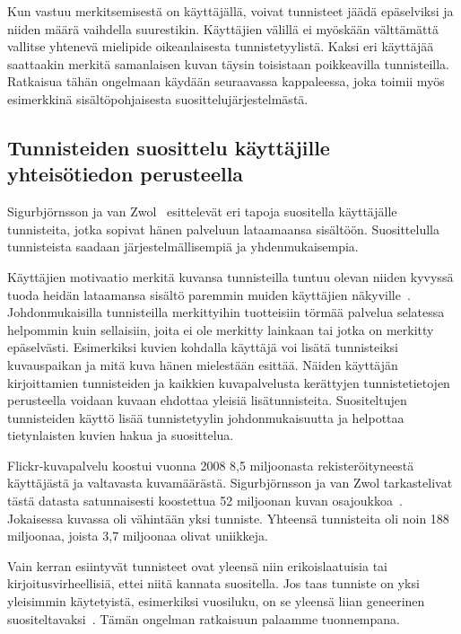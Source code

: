 \documentclass[12pt,finnish]{tktltiki2}
\theoremstyle{definition}
\theoremstyle{remark}
\begin{document}
Kun vastuu merkitsemisestä on käyttäjällä, voivat tunnisteet jäädä epäselviksi ja niiden määrä vaihdella suurestikin. Käyttäjien välillä ei myöskään välttämättä vallitse yhtenevä mielipide oikeanlaisesta tunnistetyylistä. Kaksi eri käyttäjää saattaakin merkitä samanlaisen kuvan täysin toisistaan poikkeavilla tunnisteilla. Ratkaisua tähän ongelmaan käydään seuraavassa kappaleessa, joka toimii myös esimerkkinä sisältöpohjaisesta suosittelujärjestelmästä.


\subsection{Tunnisteiden suosittelu käyttäjille yhteisötiedon perusteella}

Sigurbjörnsson ja van Zwol~\cite{Sigurbjornsson:2008:FTR:1367497.1367542} esittelevät eri tapoja suositella käyttäjälle tunnisteita, jotka sopivat hänen palveluun lataamaansa sisältöön. Suosittelulla tunnisteista saadaan järjestelmällisempiä ja yhdenmukaisempia.

Käyttäjien motivaatio merkitä kuvansa tunnisteilla tuntuu olevan niiden kyvyssä tuoda heidän lataamansa sisältö paremmin muiden käyttäjien näkyville~\cite{Ames:2007:WWT:1240624.1240772}. Johdonmukaisilla tunnisteilla merkittyihin tuotteisiin törmää palvelua selatessa helpommin kuin sellaisiin, joita ei ole merkitty lainkaan tai jotka on merkitty epäselvästi. Esimerkiksi kuvien kohdalla käyttäjä voi lisätä tunnisteiksi kuvauspaikan ja mitä kuva hänen mielestään esittää. Näiden käyttäjän kirjoittamien tunnisteiden ja kaikkien kuvapalvelusta kerättyjen tunnistetietojen perusteella voidaan kuvaan ehdottaa yleisiä lisätunnisteita. Suositeltujen tunnisteiden käyttö lisää tunnistetyylin johdonmukaisuutta ja helpottaa tietynlaisten kuvien hakua ja suosittelua.

Flickr-kuvapalvelu koostui vuonna 2008 8,5 miljoonasta rekisteröityneestä käyttäjästä ja valtavasta kuvamäärästä. Sigurbjörnsson ja van Zwol tarkastelivat tästä datasta satunnaisesti koostettua 52 miljoonan kuvan osajoukkoa~\cite{Sigurbjornsson:2008:FTR:1367497.1367542}. Jokaisessa kuvassa oli vähintään yksi tunniste. Yhteensä tunnisteita oli noin 188 miljoonaa, joista 3,7 miljoonaa olivat uniikkeja.

	Vain kerran esiintyvät tunnisteet ovat yleensä niin erikoislaatuisia tai kirjoitusvirheellisiä, ettei niitä kannata suositella. Jos taas tunniste on yksi yleisimmin käytetyistä, esimerkiksi vuosiluku, on se yleensä liian geneerinen suositeltavaksi~\cite{Sigurbjornsson:2008:FTR:1367497.1367542}. Tämän ongelman ratkaisuun palaamme tuonnempana.
	
\end{document}
